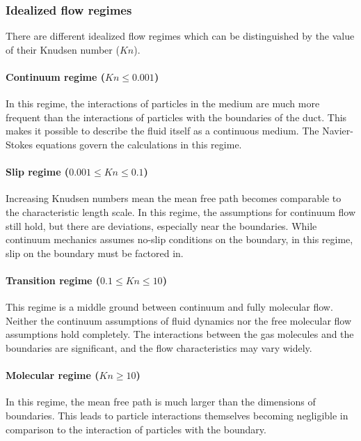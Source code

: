 \subsubsection{Idealized flow regimes}

	There are different idealized flow regimes which can be distinguished by the value of their Knudsen number (\(Kn\)).

\paragraph{Continuum regime (\(Kn \leq 0.001\))}
	
	In this regime, the interactions of particles in the medium are much more frequent than the interactions of particles with the boundaries of the duct.
	This makes it possible to describe the fluid itself as a continuous medium.
	The Navier-Stokes equations govern the calculations in this regime.

\paragraph{Slip regime (\(0.001 \leq Kn \leq 0.1\))}

	Increasing Knudsen numbers mean the mean free path becomes comparable to the characteristic length scale.
	In this regime, the assumptions for continuum flow still hold, but there are deviations, especially near the boundaries.
	While continuum mechanics assumes no-slip conditions on the boundary, in this regime, slip on the boundary must be factored in.

\paragraph{Transition regime (\(0.1 \leq Kn \leq 10\))}
	
	This regime is a middle ground between continuum and fully molecular flow.
	Neither the continuum assumptions of fluid dynamics nor the free molecular flow assumptions hold completely.
	The interactions between the gas molecules and the boundaries are significant, and the flow characteristics may vary widely.

\paragraph{Molecular regime (\(Kn \geq 10\))}

	In this regime, the mean free path is much larger than the dimensions of boundaries.
	This leads to particle interactions themselves becoming negligible in comparison to the interaction of particles with the boundary.
	
